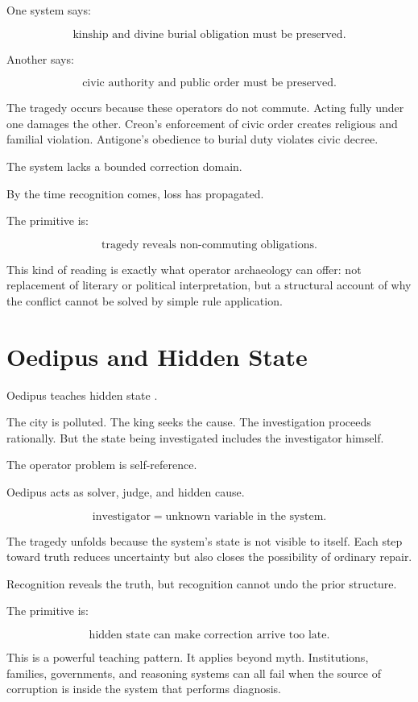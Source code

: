 \documentclass[11pt]{book}
\begin{document}
One system says:

\[
\text{kinship and divine burial obligation must be preserved}.
\]

Another says:

\[
\text{civic authority and public order must be preserved}.
\]

The tragedy occurs because these operators do not commute. Acting fully under one damages the other. Creon's enforcement of civic order creates religious and familial violation. Antigone's obedience to burial duty violates civic decree.

The system lacks a bounded correction domain.

By the time recognition comes, loss has propagated.

The primitive is:

\[
\text{tragedy reveals non-commuting obligations}.
\]

This kind of reading is exactly what operator archaeology can offer: not replacement of literary or political interpretation, but a structural account of why the conflict cannot be solved by simple rule application.

\section{Oedipus and Hidden State}

Oedipus teaches hidden state \cite{LefkowitzRomilly2016GreekTragedies}.

The city is polluted. The king seeks the cause. The investigation proceeds rationally. But the state being investigated includes the investigator himself.

The operator problem is self-reference.

Oedipus acts as solver, judge, and hidden cause.

\[
\text{investigator} = \text{unknown variable in the system}.
\]

The tragedy unfolds because the system's state is not visible to itself. Each step toward truth reduces uncertainty but also closes the possibility of ordinary repair.

Recognition reveals the truth, but recognition cannot undo the prior structure.

The primitive is:

\[
\text{hidden state can make correction arrive too late}.
\]

This is a powerful teaching pattern. It applies beyond myth. Institutions, families, governments, and reasoning systems can all fail when the source of corruption is inside the system that performs diagnosis.
\end{document}
